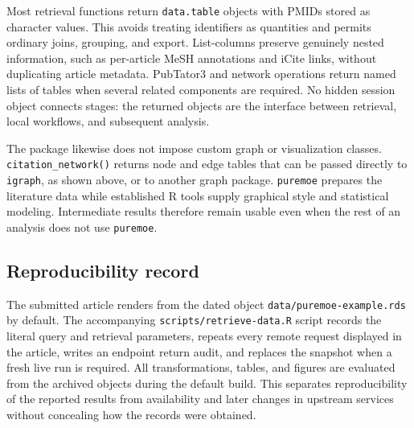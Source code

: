 Most retrieval functions return \texttt{data.table} objects \citep{barrett2025datatable}
with PMIDs stored as character values. This avoids treating identifiers as
quantities and permits ordinary joins, grouping, and export. List-columns
preserve genuinely nested information, such as per-article MeSH annotations and
iCite links, without duplicating article metadata. PubTator3 and network
operations return named lists of tables when several related components are
required. No hidden session object connects stages: the returned objects are
the interface between retrieval, local workflows, and subsequent analysis.

The package likewise does not impose custom graph or visualization classes.
\texttt{citation\_network()} returns node and edge tables that can be passed directly to
\texttt{igraph}, as shown above, or to another graph package. \texttt{puremoe} prepares the
literature data while established R tools supply graphical style and statistical
modeling. Intermediate results therefore remain usable even when the rest of an
analysis does not use \texttt{puremoe}.

\subsection{Reproducibility record}\label{reproducibility-record}

The submitted article renders from the dated object
\texttt{data/puremoe-example.rds} by default. The accompanying
\texttt{scripts/retrieve-data.R} script records the literal query and retrieval
parameters, repeats every remote request displayed in the article, writes an
endpoint return audit, and replaces the snapshot when a fresh live run is
required. All transformations, tables, and figures are evaluated from the
archived objects during the default build. This separates reproducibility of
the reported results from availability and later changes in upstream services
without concealing how the records were obtained.

\begin{table}[!h]
\centering
\caption{\label{tab:reproducibility-record}Environment and retrieval settings for the archived article snapshot.}
\centering
{}
\end{table}


